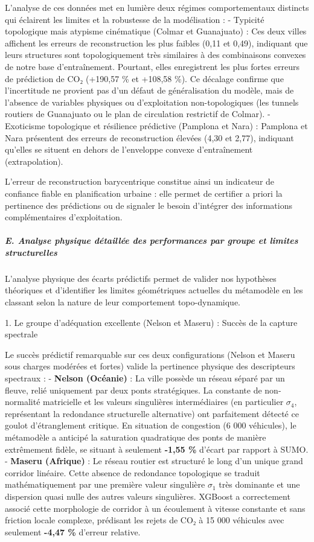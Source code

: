 \documentclass[10pt, a4paper]{article}
\begin{document}
L'analyse de ces données met en lumière deux régimes comportementaux
distincts qui éclairent les limites et la robustesse de la modélisation
: - Typicité topologique mais atypisme cinématique (Colmar et
Guanajuato) : Ces deux villes affichent les erreurs de reconstruction
les plus faibles (0,11 et 0,49), indiquant que leurs structures sont
topologiquement très similaires à des combinaisons convexes de notre
base d'entraînement. Pourtant, elles enregistrent les plus fortes
erreurs de prédiction de CO₂ (+190,57 \% et +108,58 \%). Ce décalage
confirme que l'incertitude ne provient pas d'un défaut de généralisation
du modèle, mais de l'absence de variables physiques ou d'exploitation
non-topologiques (les tunnels routiers de Guanajuato ou le plan de
circulation restrictif de Colmar). - Exoticisme topologique et
résilience prédictive (Pamplona et Nara) : Pamplona et Nara présentent
des erreurs de reconstruction élevées (4,30 et 2,77), indiquant qu'elles
se situent en dehors de l'enveloppe convexe d'entraînement
(extrapolation).

L'erreur de reconstruction barycentrique constitue ainsi un indicateur
de confiance fiable en planification urbaine : elle permet de certifier
a priori la pertinence des prédictions ou de signaler le besoin
d'intégrer des informations complémentaires d'exploitation.

\subparagraph{E. Analyse physique détaillée des performances par groupe
et limites
structurelles}\label{e.-analyse-physique-duxe9tailluxe9e-des-performances-par-groupe-et-limites-structurelles}

L'analyse physique des écarts prédictifs permet de valider nos
hypothèses théoriques et d'identifier les limites géométriques actuelles
du métamodèle en les classant selon la nature de leur comportement
topo-dynamique.

1. Le groupe d'adéquation excellente (Nelson et Maseru) : Succès de la
capture spectrale

Le succès prédictif remarquable sur ces deux configurations (Nelson et
Maseru sous charges modérées et fortes) valide la pertinence physique
des descripteurs spectraux : - \textbf{Nelson (Océanie)} : La ville
possède un réseau séparé par un fleuve, relié uniquement par deux ponts
stratégiques. La constante de non-normalité matricielle et les valeurs
singulières intermédiaires (en particulier \(\sigma_4\), représentant la
redondance structurelle alternative) ont parfaitement détecté ce goulot
d'étranglement critique. En situation de congestion (6 000 véhicules),
le métamodèle a anticipé la saturation quadratique des ponts de manière
extrêmement fidèle, se situant à seulement \textbf{-1,55 \%} d'écart par
rapport à SUMO. - \textbf{Maseru (Afrique)} : Le réseau routier est
structuré le long d'un unique grand corridor linéaire. Cette absence de
redondance topologique se traduit mathématiquement par une première
valeur singulière \(\sigma_1\) très dominante et une dispersion quasi
nulle des autres valeurs singulières. XGBoost a correctement associé
cette morphologie de corridor à un écoulement à vitesse constante et
sans friction locale complexe, prédisant les rejets de CO₂ à 15 000
véhicules avec seulement \textbf{-4,47 \%} d'erreur relative.
\end{document}
